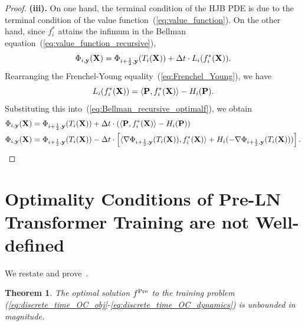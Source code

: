 \documentclass[journal]{IEEEtran}
\def\eqref#1{equation~\ref{#1}}
\newcommand{\bfP}{{\bf P}}
\newcommand{\bfX}{{\bf X}}
\newcommand{\bfy}{ {\bf y}}
\renewcommand{\eqref}[1]{(\ref{#1})}
\theoremstyle{plain}
\newtheorem{theorem}{Theorem}
\theoremstyle{definition}
\theoremstyle{remark}
\newcounter{tmpTheoremCounter}
\newcommand{\settheoremnumber}[1]{%
  \setcounter{tmpTheoremCounter}{\value{theorem}}%
  \setcounter{theorem}{\getrefnumber{#1}}%
  \addtocounter{theorem}{-1}%
}
\newcommand{\restoretheoremnumber}{%
  \setcounter{theorem}{\value{tmpTheoremCounter}}%
}
\begin{document}
\begin{proof}
    \textbf{(iii).} On one hand, the terminal condition of the HJB PDE is due to the terminal condition of the value function~\eqref{eq:value_function}. On the other hand, since $f_i^*$ attains the infimum in the Bellman equation~\eqref{eq:value_function_recursive}, 
    \begin{equation}\label{eq:Bellman_recursive_optimalf}
    \Phi_{i, \bfy}(\bfX) = \Phi_{i+\frac{1}{2}, \bfy}(T_i(\bfX)) + \Delta t \cdot L_i(f_i^*(\bfX)) .
    \end{equation}
    Rearranging the Frenchel-Young equality~\eqref{eq:Frenchel_Young}, we have
    \[
        L_i(f_i^*(\bfX))  = \langle \bfP, f_i^*(\bfX) \rangle -H_i(\bfP) .
    \]
    Substituting this into~\eqref{eq:Bellman_recursive_optimalf}, we obtain
    \begin{align*}
        \Phi_{i, \bfy}(\bfX) &= \Phi_{i+\frac{1}{2}, \bfy}(T_i(\bfX)) + \Delta t \cdot \left( \langle \bfP, f_i^*(\bfX) \rangle -H_i(\bfP) \right) \\
        \Phi_{i, \bfy}(\bfX) &= \Phi_{i+\frac{1}{2}, \bfy}(T_i(\bfX)) - \Delta t \cdot \left[ \langle \nabla \Phi_{i+\frac{1}{2}, \bfy}(T_i(\bfX)), f_i^*(\bfX) \rangle + H_i(-\nabla \Phi_{i+\frac{1}{2}, \bfy}(T_i(\bfX))) \right].
    \end{align*}
\end{proof}

\section{Optimality Conditions of Pre-LN Transformer Training are not Well-defined}
We restate and prove~.


\settheoremnumber{thm:Pre-LN_illposed}
\begin{theorem}
    The optimal solution $f^{\rm Pre}$ to the training problem (\ref{eq:discrete_time_OC_obj}-\ref{eq:discrete_time_OC_dynamics}) is unbounded in magnitude.
\end{theorem}
\restoretheoremnumber
\end{document}
